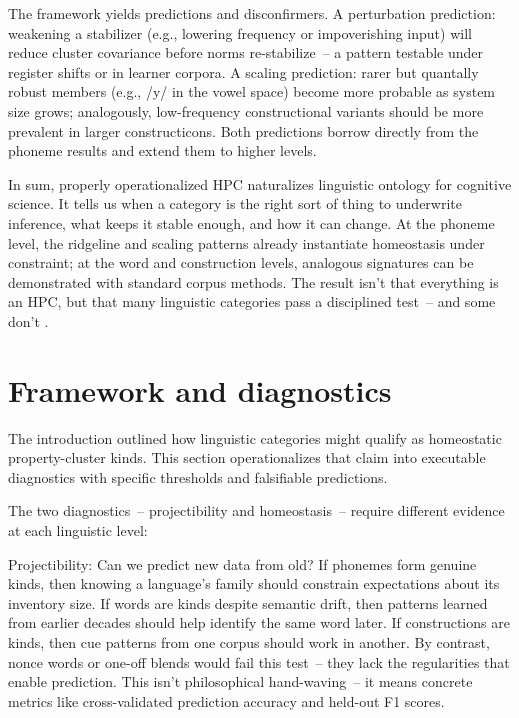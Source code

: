 \documentclass[12pt]{article}
\begin{document}
The framework yields predictions and disconfirmers. A perturbation prediction: weakening a stabilizer (e.g., lowering frequency or impoverishing input) will reduce cluster covariance before norms re-stabilize~-- a pattern testable under register shifts or in learner corpora. A scaling prediction: rarer but quantally robust members (e.g., /y/ in the vowel space) become more probable as system size grows; analogously, low-frequency constructional variants should be more prevalent in larger constructicons. Both predictions borrow directly from the phoneme results \citep[Fig.\,2 p.\,7]{Ekstrom2025PhonemeTool} and extend them to higher levels.

In sum, properly operationalized HPC naturalizes linguistic ontology for cognitive science. It tells us when a category is the right sort of thing to underwrite inference, what keeps it stable enough, and how it can change. At the phoneme level, the ridgeline and scaling patterns already instantiate homeostasis under constraint; at the word and construction levels, analogous signatures can be demonstrated with standard corpus methods. The result isn't that everything is an HPC, but that many linguistic categories pass a disciplined test~-- and some don't \citep{Miller2021WordsSpeciesKinds,Ekstrom2025PhonemeTool}.

\section{Framework and diagnostics}\label{sec:framework}

The introduction outlined how linguistic categories might qualify as homeostatic property-cluster kinds. This section operationalizes that claim into executable diagnostics with specific thresholds and falsifiable predictions.

The two diagnostics~-- projectibility and homeostasis~-- require different evidence at each linguistic level:

Projectibility: Can we predict new data from old? If phonemes form genuine kinds, then knowing a language's family should constrain expectations about its inventory size. If words are kinds despite semantic drift, then patterns learned from earlier decades should help identify the same word later. If constructions are kinds, then cue patterns from one corpus should work in another. By contrast, nonce words or one-off blends would fail this test~-- they lack the regularities that enable prediction. This isn't philosophical hand-waving~-- it means concrete metrics like cross-validated prediction accuracy and held-out F1 scores.
\end{document}
